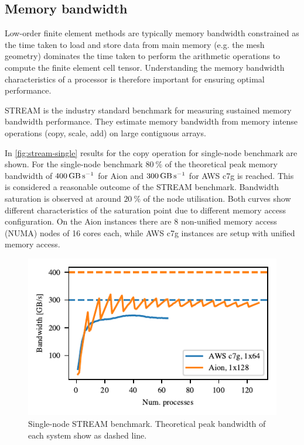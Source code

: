 \subsection*{Memory bandwidth}

Low-order finite element methods are typically memory bandwidth constrained as
the time taken to load and store data from main memory (e.g. the mesh geometry)
dominates the time taken to perform the arithmetic operations to compute the
finite element cell tensor. Understanding the memory bandwidth characteristics
of a processor is therefore important for ensuring optimal performance.

STREAM \citep{McCalpin1995,McCalpin2007} is the industry standard benchmark for
measuring sustained memory bandwidth performance. They estimate memory bandwidth
from memory intense operations (copy, scale, add) on large contiguous arrays.

In \autoref{fig:stream-single} results for the copy operation for single-node
benchmark are shown. For the single-node benchmark $\SI{80}{\percent}$ of
the theoretical peak memory bandwidth of $\SI{400}{\giga\byte\per\second}$ for Aion
and $\SI{300}{\giga\byte\per\second}$ for AWS c7g is reached. This is considered a
reasonable outcome of the STREAM benchmark. Bandwidth saturation is observed
at around $\SI{20}{\percent}$ of the node utilisation. Both curves show different
characteristics of the saturation point due to different memory access
configuration. On the Aion instances there are 8 non-unified memory access
(NUMA) nodes of 16 cores each, while AWS c7g instances are setup with unified
memory access.

\begin{figure}
\begin{center}
        \includegraphics{chapters/chp1/graphics/stream_plots/stream_single_node.pdf}
\end{center}
	\caption{Single-node STREAM benchmark. Theoretical peak bandwidth of each system show as dashed line.}
        \label{fig:stream-single}
\end{figure}

